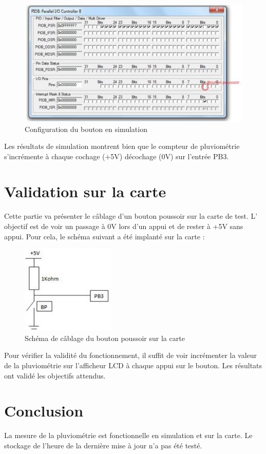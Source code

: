 \documentclass[a4paper]{report}
\begin{document}
\begin{figure}[h!]
	\centering
	\includegraphics[scale=0.6]{images/PLUV_fig4.jpg}
	\caption{Configuration du bouton en simulation\label{PLUV-fig4}}
\end{figure}

Les résultats de simulation montrent bien que le compteur de pluviométrie s’incrémente à chaque cochage (+5V) décochage (0V) sur l’entrée PB3.

\section{Validation sur la carte}
Cette partie va présenter le câblage d’un bouton poussoir sur la carte de test.
L' objectif est de voir un passage à 0V lors d’un appui et de rester à +5V sans appui.
Pour cela, le schéma suivant a été implanté sur la carte :

\begin{figure}[h!]
	\centering
	\includegraphics[scale=0.9]{images/PLUV_fig5.jpg}
	\caption{Schéma de câblage du bouton poussoir sur la carte\label{PLUV-fig5}}
\end{figure}

Pour vérifier la validité du fonctionnement, il suffit de voir incrémenter la valeur de la pluviométrie sur l’afficheur LCD à chaque appui sur le bouton.
Les résultats ont validé les objectifs attendus.

\section{Conclusion}
La mesure de la pluviométrie est fonctionnelle en simulation et sur la carte.
Le stockage de l’heure de la dernière mise à jour n’a pas été testé.
\end{document}
